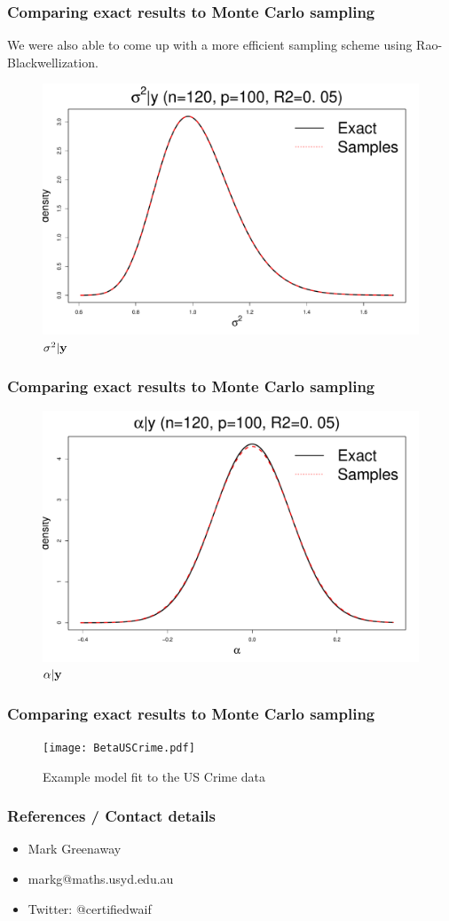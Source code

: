 \documentclass{beamer}
\begin{document}
\begin{frame}
	\frametitle{Comparing exact results to Monte Carlo sampling}
	We were also able to come up with a more efficient sampling scheme using Rao-Blackwellization.
	\begin{figure}
		\caption{$\sigma^2 | {\bf y}$}
		\includegraphics[scale=.33]{sigma2GivenY.pdf}
	\end{figure}
\end{frame}

\begin{frame}
	\frametitle{Comparing exact results to Monte Carlo sampling}
	\begin{figure}
		\caption{$\alpha | {\bf y}$}
		\includegraphics[scale=.33]{alphaGivenY.pdf}
	\end{figure}
\end{frame}

\begin{frame}
	\frametitle{Comparing exact results to Monte Carlo sampling}
	\begin{figure}
		\caption{Example model fit to the US Crime data}
		\texttt{[image: BetaUSCrime.pdf]}
	\end{figure}
\end{frame}

\begin{frame}
	\frametitle{References / Contact details}
	\begin{itemize}
		\item Mark Greenaway
		\item markg@maths.usyd.edu.au
		\item Twitter: @certifiedwaif	
	\end{itemize}

	\small
	
	
\end{frame}
\end{document}
